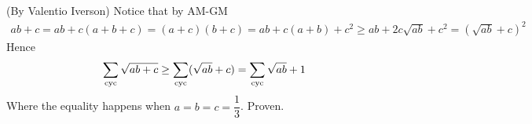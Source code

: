 
\begin{solusi}(By Valentio Iverson)
    Notice that by AM-GM
    \begin{align*} 
        ab + c = ab + c(a + b + c) = (a + c)(b + c) = ab + c(a + b) + c^2 \geq ab + 2c\sqrt{ab} + c^2 = (\sqrt{ab} + c)^2
    \end{align*}
    Hence
    \begin{align*}
        \sum_{\mathrm{cyc}} \sqrt{ab+c} \ge \sum_{\mathrm{cyc}} (\sqrt{ab} + c) = \sum_{\mathrm{cyc}} \sqrt{ab} + 1
    \end{align*}
    Where the equality happens when $a=b=c=\dfrac{1}{3}$. Proven.
\end{solusi}